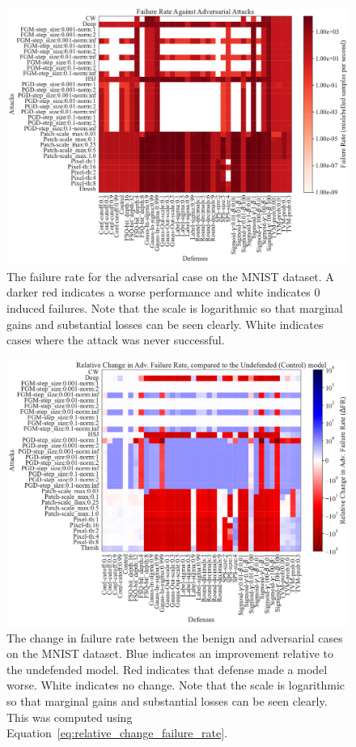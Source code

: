 \documentclass[journal]{IEEEtran}
\begin{document}
\begin{figure}[!hptb]
    {\centering
    \includegraphics[trim={0 0.85em 0 0.35em},clip,height=0.6\textwidth]{images/mnist/rate_grid.pdf}
    \vspace{-0.5em}
    \caption{The failure rate for the adversarial case on the MNIST dataset. A darker red indicates a worse performance and white indicates 0 induced failures. Note that the scale is logarithmic so that marginal gains and substantial losses can be seen clearly. White indicates cases where the attack was never successful.}
    \label{fig:mnist_rate_grid}
    } %
\end{figure}

\begin{figure}[!hptb]
    {\centering
    \includegraphics[trim={0 0.85em 0 0.35em},clip,height=0.6\textwidth]{images/mnist/gap_grid.pdf}
    \vspace{-0.5em}
    \caption{The change in failure rate between the benign and adversarial cases on the MNIST dataset. Blue indicates an improvement relative to the undefended model. Red indicates that defense made a model worse. White indicates no change. Note that the scale is logarithmic so that marginal gains and substantial losses can be seen clearly. This was computed using Equation~\ref{eq:relative_change_failure_rate}.}
    \label{fig:mnist_change_grid}
    } %
\end{figure}
\end{document}
